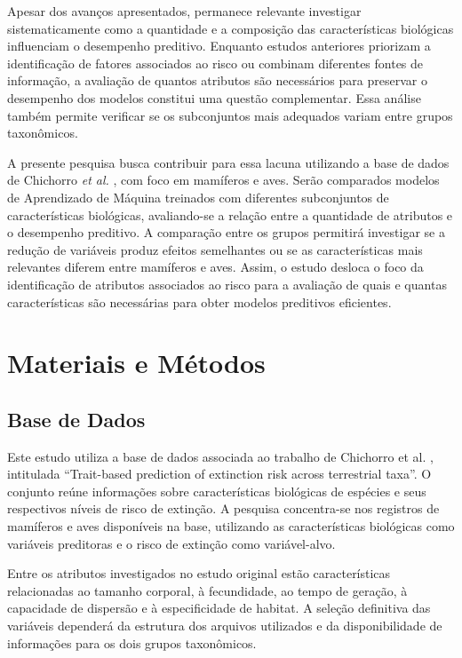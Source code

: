 \documentclass[conference]{IEEEtran}
\begin{document}
Apesar dos avanços apresentados, permanece relevante investigar sistematicamente como a quantidade e a composição das características biológicas influenciam o desempenho preditivo. Enquanto estudos anteriores priorizam a identificação de fatores associados ao risco ou combinam diferentes fontes de informação, a avaliação de quantos atributos são necessários para preservar o desempenho dos modelos constitui uma questão complementar. Essa análise também permite verificar se os subconjuntos mais adequados variam entre grupos taxonômicos.

A presente pesquisa busca contribuir para essa lacuna utilizando a base de dados de Chichorro \textit{et al.} \cite{b5}, com foco em mamíferos e aves. Serão comparados modelos de Aprendizado de Máquina treinados com diferentes subconjuntos de características biológicas, avaliando-se a relação entre a quantidade de atributos e o desempenho preditivo. A comparação entre os grupos permitirá investigar se a redução de variáveis produz efeitos semelhantes ou se as características mais relevantes diferem entre mamíferos e aves. Assim, o estudo desloca o foco da identificação de atributos associados ao risco para a avaliação de quais e quantas características são necessárias para obter modelos preditivos eficientes.

\section{Materiais e Métodos}

\subsection{Base de Dados}

Este estudo utiliza a base de dados associada ao trabalho de Chichorro et al. \cite{b5}, intitulada ``Trait-based prediction of extinction risk across terrestrial taxa''. O conjunto reúne informações sobre características biológicas de espécies e seus respectivos níveis de risco de extinção. A pesquisa concentra-se nos registros de mamíferos e aves disponíveis na base, utilizando as características biológicas como variáveis preditoras e o risco de extinção como variável-alvo.

Entre os atributos investigados no estudo original estão características relacionadas ao tamanho corporal, à fecundidade, ao tempo de geração, à capacidade de dispersão e à especificidade de habitat. A seleção definitiva das variáveis dependerá da estrutura dos arquivos utilizados e da disponibilidade de informações para os dois grupos taxonômicos.
\end{document}
